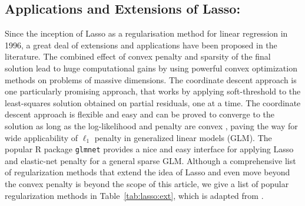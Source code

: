 \documentclass[11pt]{article}
\begin{document}
\subsection{Applications and Extensions of Lasso:} Since the inception of Lasso
as a regularisation method for linear regression in 1996, a great deal of
extensions and applications have been proposed in the literature. The combined
effect of convex penalty and sparsity of the final solution lead to huge
computational gains by using powerful convex optimization methods on problems
of massive dimensions. The coordinate descent approach
\citep{friedman_pathwise_2007,friedman2010regularization} is one particularly
promising approach, that works by applying soft-threshold to the least-squares
solution obtained on partial residuals, one at a time. The coordinate descent
approach is flexible and easy and can be proved to converge to the solution as
long as the log-likelihood and penalty are convex \citep{tseng2001convergence},
paving the way for wide applicability of $\ell_1$ penalty in generalized linear
models (GLM). The popular R package \texttt{glmnet} provides a nice and easy
interface for applying Lasso and elastic-net penalty for a general sparse GLM.
Although a comprehensive list of regularization methods that extend the idea of
Lasso and even move beyond the convex penalty is beyond the scope of this
article, we give a list of popular regularization methods in 
Table~\ref{tab:lasso:ext}, which is adapted from \citet{tibshirani2014praise}.
\end{document}
